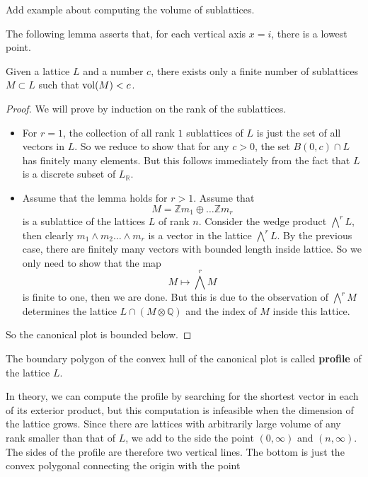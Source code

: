 \begin{example}
    Add example about computing the volume of sublattices.
\end{example}
The following lemma asserts that, for each vertical axis $x =i$, there is a lowest point.
\begin{lemma}
    Given a lattice $L$ and a number $c$, there exists only a finite number of sublattices $M \subset L$ such that
    $\operatorname{vol}(M)<c$.
\end{lemma}
\begin{proof}
    We will prove by induction on the rank of the sublattices.
    \begin{itemize}
        \item For $r =1$, the collection of all rank $1$ sublattices of $L$ is just the set of all vectors in $L$. So we reduce
              to show that for any $c>0$, the set $B(0,c) \cap L$  has finitely many elements. But this follows immediately from the fact that
              $L$ is a discrete subset of $L_\mathbb{R}$.
        \item Assume that the lemma holds for $r >1$. Assume that
              \[M = \mathbb{Z}m_1\oplus \ldots \mathbb{Z}m_r\]
              is a sublattice of the lattices $L$ of rank $n$. Consider the wedge product $\bigwedge^r L$, then clearly
              $m_1\wedge m_2\ldots \wedge m_r$ is a vector in the lattice  $\bigwedge^r L$.
              By the previous case, there are finitely
              many vectors with bounded length inside lattice. So we only need to show that the map
              \[ M \mapsto \bigwedge^r M \]
              is finite to one, then we are done. But this is due to the observation of $\bigwedge^r M$ determines the lattice $L \cap (M \otimes \mathbb{Q})$ and the index of $M$ inside this lattice.
    \end{itemize}
    So the canonical plot is bounded below.
\end{proof}
\begin{definition}
    The boundary polygon of the convex hull of the canonical plot is called \textbf{profile} of the lattice $L$.
\end{definition}
In theory, we can compute the profile by searching for the shortest vector in each of its exterior product, but this computation
is infeasible when the dimension of the lattice grows. Since there are lattices with
arbitrarily large volume of any rank smaller than that of $L$, we add to the side the point $(0,\infty)$ and $(n,\infty)$. The sides
of the profile are therefore two vertical lines. The bottom is just the convex polygonal connecting the origin with the point
